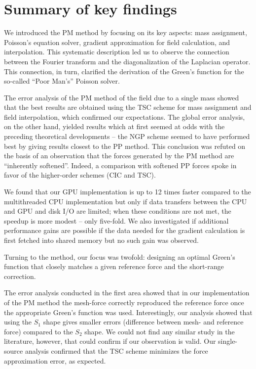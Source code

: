 \section{Summary of key findings}
We introduced the PM method by focusing on its key aspects: mass assignment, Poisson's equation solver, gradient approximation for field calculation, and interpolation.
This systematic description led us to observe the connection between the Fourier transform and the diagonalization of the Laplacian operator.
This connection, in turn, clarified the derivation of the Green's function for the so-called ``Poor Man's'' Poisson solver.

The error analysis of the PM method of the field due to a single mass showed that the best results are obtained using the TSC scheme for mass assignment and field interpolation, which confirmed our expectations.
The global error analysis, on the other hand, yielded results which at first seemed at odds with the preceding theoretical developments -- the NGP scheme seemed to have performed best by giving results closest to the PP method.
This conclusion was refuted on the basis of an observation that the forces generated by the PM method are ``inherently softened''.
Indeed, a comparison with softened PP forces spoke in favor of the higher-order schemes (CIC and TSC).

We found that our GPU implementation is up to 12 times faster compared to the multithreaded CPU implementation but only if data transfers between the CPU and GPU and disk I/O are limited; when these conditions are not met, the speedup is more modest -- only five-fold.
We also investigated if additional performance gains are possible if the data needed for the gradient calculation is first fetched into shared memory but no such gain was observed.

Turning to the \PThreeM{} method, our focus was twofold: designing an optimal Green's function that closely matches a given reference force and the short-range correction.

The error analysis conducted in the first area showed that in our implementation of the PM method the mesh-force correctly reproduced the reference force once the appropriate Green's function was used.
Interestingly, our analysis showed that using the $S_1$ shape gives smaller errors (difference between mesh- and reference force) compared to the $S_2$ shape.
We could not find any similar study in the literature, however, that could confirm if our observation is valid.
Our single-source analysis confirmed that the TSC scheme minimizes the force approximation error, as expected.

